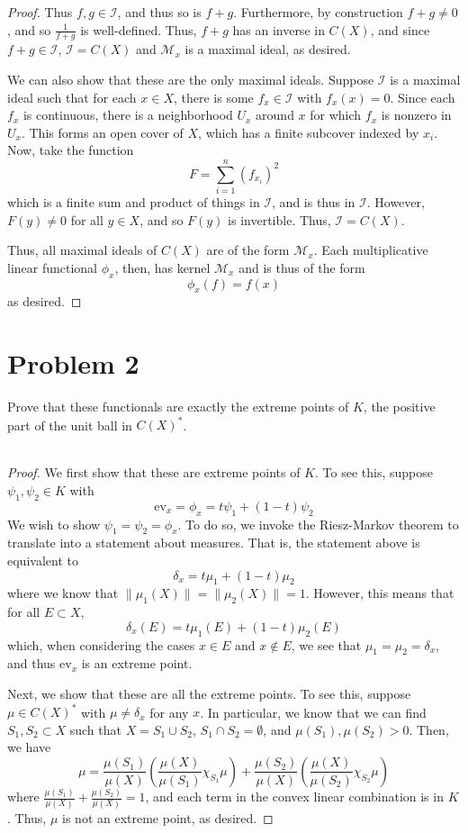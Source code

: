 \documentclass[fontsize=11pt]{scrartcl} %
\numberwithin{equation}{section} %
\numberwithin{figure}{section} %
\numberwithin{table}{section} %
\newcommand{\ev}{\text{ev}}
\begin{document}
\begin{proof}
    Thus $f,g\in\mathscr{I}$, and thus so is $f+g$. Furthermore, by construction
    $f+g\neq 0$, and so $\frac{1}{f+g}$ is well-defined. Thus, $f+g$ has an
    inverse in $C(X)$, and since $f+g\in\mathscr{I}$, $\mathscr{I}=C(X)$ and
    $\mathscr{M}_x$ is a maximal ideal, as desired.

    We can also show that these are the only maximal ideals. Suppose
    $\mathscr{I}$ is a maximal ideal such that for each $x\in X$, there is some
    $f_x\in \mathscr{I}$ with $f_x(x)=0$. Since each $f_x$ is continuous, there
    is a neighborhood $U_x$ around $x$ for which $f_x$ is nonzero in $U_x$. This
    forms an open cover of $X$, which has a finite subcover indexed by $x_i$.
    Now, take the function
    \[
        F = \sum_{i=1}^n (f_{x_i})^2
    \]
    which is a finite sum and product of things in $\mathscr{I}$, and is thus in
    $\mathscr{I}$. However, $F(y)\neq 0$ for all $y\in X$, and so $F(y)$ is
    invertible. Thus, $\mathscr{I} = C(X)$.

    Thus, all maximal ideals of $C(X)$ are of the form $\mathscr{M}_x$. Each
    multiplicative linear functional $\phi_x$, then, has kernel $\mathscr{M}_x$
    and is thus of the form
    \[
    \phi_x(f) = f(x)
    \]
    as desired.
\end{proof}

\newpage

\section*{Problem 2}
Prove that these functionals are exactly the extreme points of $K$, the positive
part of the unit ball in $C(X)^*$.
\\
\\
\begin{proof}
    We first show that these are extreme points of $K$. To see this, suppose
    $\psi_1,\psi_2\in K$ with
    \[
        \ev_x = \phi_x = t\psi_1 + (1-t)\psi_2
    \]
    We wish to show $\psi_1 = \psi_2 = \phi_x$.
    To do so, we invoke the Riesz-Markov theorem to translate into a statement
    about measures. That is, the statement above is equivalent to
    \[
        \delta_x = t\mu_1 + (1-t)\mu_2
    \]
    where we know that $\|\mu_1(X)\|=\|\mu_2(X)\|=1$. However, this means that
    for all $E\subset X$,
    \[
        \delta_x(E) = t\mu_1(E) + (1-t)\mu_2(E)
    \]
    which, when considering the cases $x\in E$ and $x\not\in E$, we see that
    $\mu_1=\mu_2=\delta_x$, and thus $\ev_x$ is an extreme point.

    Next, we show that these are all the extreme points. To see this, suppose
    $\mu\in C(X)^*$ with $\mu\neq \delta_x$ for any $x$. In particular, we know
    that we can find $S_1,S_2\subset X$ such that $X=S_1\cup S_2$, $S_1\cap
    S_2=\emptyset$, and $\mu(S_1),\mu(S_2)>0$. Then, we have
    \[
        \mu =
        \frac{\mu(S_1)}{\mu(X)}\left(\frac{\mu(X)}{\mu(S_1)}\chi_{S_1}\mu\right) +
        \frac{\mu(S_2)}{\mu(X)}\left(\frac{\mu(X)}{\mu(S_2)}\chi_{S_2}\mu\right)
    \]
    where $\frac{\mu(S_1)}{\mu(X)} + \frac{\mu(S_2)}{\mu(X)} = 1$, and each
    term in the convex linear combination is in $K$. Thus, $\mu$ is not an
    extreme point, as desired.
\end{proof}
\end{document}

